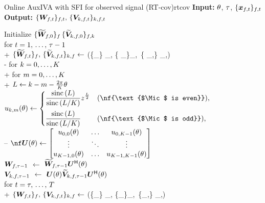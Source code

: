 \documentclass[sip,biber]{now-journal}
\begin{document}
\begin{algorithm}{Online AuxIVA with SFI for observed signal (RT-cov)}{rtcov}
  \textbf{Input:} $\theta$, $\tau$, $\{\Obs _{\ft}\} _{\ft}$ \\
  \textbf{Output:} $\{\Demix _{\ft}\}_{\ft},\, \{\cov _{\src,\ft}\}_{\src,\ft}$
  \begin{pseudo}
    Initialize $\{\widetilde{\bm{W}} _{f,0}\} _{f} \, \{\widetilde{\bm{V}} _{k,f,0}\} _{f,k}$ \\
    for $t = 1,\, \dots,\, \tau - 1$ \\+
      $\{\refpos{\Demix} _{\ft}\}_{\freq},\, \{\refpos{\cov} _{\src,\ft}\} _{\src,\freq} \gets$ (\{\Obs _{\ft}\} _{\freq}, \{ _{\ft[-1]}\}_{\freq},\, \{ _{\src,\ft[-1]}\} _{\src,\freq}) \\-
    for $k = 0, \dots, K$ \\+
      for $m = 0, \dots, K$ \\+
        $L \gets k - m - \frac{2\pi}{K} \theta$ \\
        $\rotmat _{\src,\mic}(\rotSpat) \gets
          \begin{cases}
            \displaystyle \frac{\sinc{(\rotIdx)}}{\sinc{\left(\rotIdx / \Mic\right)}} \twid ^{\frac{\rotIdx}{2}} & (\nf{\text{$\Mic$ is even}}),\\[1em]
            \displaystyle \frac{\sinc{(\rotIdx)}}{\sinc{\left(\rotIdx / \Mic\right)}} & (\nf{\text{$\Mic$ is odd}}),
          \end{cases}
        $ \ct{\eqref{eq:rot:sinc}} \\--
    $\nf\rotMat (\rotSpat) \gets
      \begin{bmatrix}
        \rotmat _{0, 0}(\rotSpat) & \dots & \rotmat _{0, \Mic - 1}(\rotSpat) \\
        \vdots & \ddots & \vdots \\
        \rotmat _{\Mic - 1, 0}(\rotSpat) & \dots & \rotmat _{\Mic - 1, \Mic - 1}(\rotSpat)
      \end{bmatrix}
      $ \ct{\eqref{eq:rotmat}} \\
    {$\bm{W} _{f,\tau - 1}$}    $\gets$ $\widetilde{\bm{W}} _{f,\tau - 1} \bm{U} ^{\mathsf{H}} (\theta)$ \ct{$(\forall \freq)$} \\
    {$\bm{V} _{k,f,\tau - 1}$} $\gets$ $\bm{U} (\theta) \widetilde{\bm{V}} _{k,f,\tau - 1} \bm{U} ^{\mathsf{H}} (\theta)$ \ct{$(\forall \src,\freq)$} \\
    for $t = \tau,\, \dots,\, T$ \\+
      $\{\Demix _{\ft}\}_{\freq},\, \{\cov _{\src,\ft}\} _{\src,\freq} \gets$ (\{\Obs _{\ft}\} _{\freq}, \{\Demix _{\ft[-1]}\}_{\freq},\, \{\cov _{\src,\ft[-1]}\} _{\src,\freq})
  \end{pseudo}
\end{algorithm}
\end{document}
